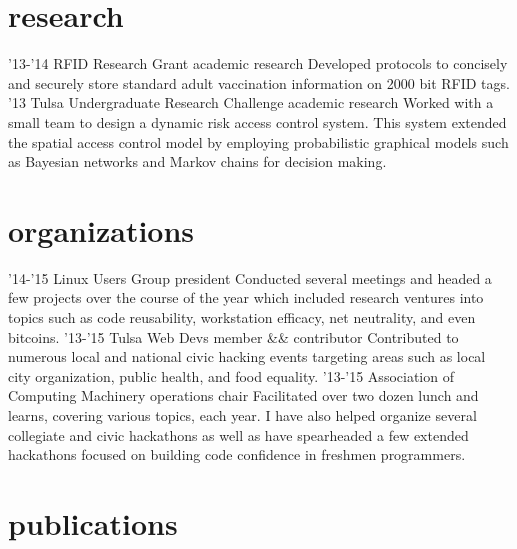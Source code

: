 \documentclass[]{friggeri-cv}
\begin{document}
\section{research}

\begin{entrylist}
  \entry
    {'13-'14}
    {RFID Research Grant}
    {academic research}
    {Developed protocols to concisely and securely store standard adult vaccination information on 2000 bit RFID tags.}
  \entry
    {'13}
    {Tulsa Undergraduate Research Challenge}
    {academic research}
    {Worked with a small team to design a dynamic risk access control system. This system extended the spatial access control model by employing probabilistic graphical models such as Bayesian networks and Markov chains for decision making.}
\end{entrylist}

\section{organizations}

\begin{entrylist}
  \entry
    {'14-'15}
    {Linux Users Group}
    {president}
    {Conducted several meetings and headed a few projects over the course of the year which included research ventures into topics such as code reusability, workstation efficacy, net neutrality, and even bitcoins.}
  \entry
    {'13-'15}
    {Tulsa Web Devs}
    {member \&\& contributor}
    {Contributed to numerous local and national civic hacking events targeting areas such as local city organization, public health, and food equality.}
  \entry
    {'13-'15}
    {Association of Computing Machinery}
    {operations chair}
    {Facilitated over two dozen lunch and learns, covering various topics, each year. I have also helped organize several collegiate and civic hackathons as well as have spearheaded a few extended hackathons focused on building code confidence in freshmen programmers.}
\end{entrylist}

\section{publications}


\begin{refsection}
  \nocite{*}
  \printbibliography[sorting=chronological, type=inproceedings, title={international peer-reviewed conferences/proceedings}, notkeyword={france}, heading=subbibliography]
\end{refsection}
\begin{refsection}
  \nocite{*}
  \printbibliography[sorting=chronological, type=inproceedings, title={local peer-reviewed conferences/proceedings}, keyword={france}, heading=subbibliography]
\end{refsection}
\end{document}
